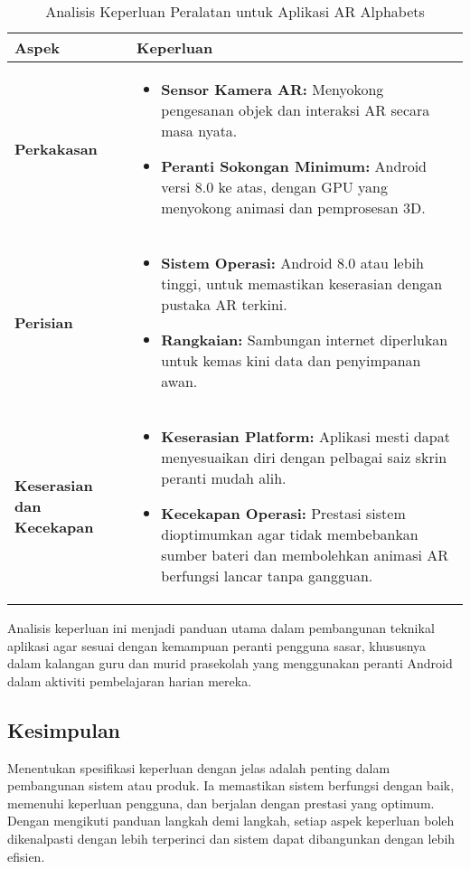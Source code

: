 \begin{table}[H]
\centering
\caption{Analisis Keperluan Peralatan untuk Aplikasi AR Alphabets}
\label{jadual:keperluan-peralatan}
\begin{tabularx}{\textwidth}{|X|X|}
\hline
\textbf{Aspek} & \textbf{Keperluan} \\
\hline
\textbf{Perkakasan} &
\parbox[t]{\linewidth}{
\begin{itemize}
    \item \textbf{Sensor Kamera AR:} Menyokong pengesanan objek dan interaksi AR secara masa nyata.
    \item \textbf{Peranti Sokongan Minimum:} Android versi 8.0 ke atas, dengan GPU yang menyokong animasi dan pemprosesan 3D.
\end{itemize}
} \\
\hline
\textbf{Perisian} &
\parbox[t]{\linewidth}{
\begin{itemize}
    \item \textbf{Sistem Operasi:} Android 8.0 atau lebih tinggi, untuk memastikan keserasian dengan pustaka AR terkini.
    \item \textbf{Rangkaian:} Sambungan internet diperlukan untuk kemas kini data dan penyimpanan awan.
\end{itemize}
} \\
\hline
\textbf{Keserasian dan Kecekapan} &
\parbox[t]{\linewidth}{
\begin{itemize}
    \item \textbf{Keserasian Platform:} Aplikasi mesti dapat menyesuaikan diri dengan pelbagai saiz skrin peranti mudah alih.
    \item \textbf{Kecekapan Operasi:} Prestasi sistem dioptimumkan agar tidak membebankan sumber bateri dan membolehkan animasi AR berfungsi lancar tanpa gangguan.
\end{itemize}
} \\
\hline
\end{tabularx}
\end{table}
Analisis keperluan ini menjadi panduan utama dalam pembangunan teknikal aplikasi agar sesuai dengan kemampuan peranti pengguna sasar, khususnya dalam kalangan guru dan murid prasekolah yang menggunakan peranti Android dalam aktiviti pembelajaran harian mereka.
\clearpage


\subsection{Kesimpulan}
Menentukan spesifikasi keperluan dengan jelas adalah penting dalam pembangunan sistem atau produk. Ia memastikan sistem berfungsi dengan baik, memenuhi keperluan pengguna, dan berjalan dengan prestasi yang optimum. Dengan mengikuti panduan langkah demi langkah, setiap aspek keperluan boleh dikenalpasti dengan lebih terperinci dan sistem dapat dibangunkan dengan lebih efisien.

